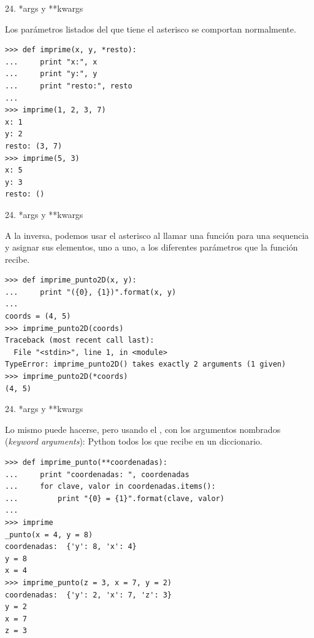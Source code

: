 \documentclass[14pt]{beamer}
\begin{document}
\begin{frame}[fragile]{24. *args y **kwargs}
  \begin{block}{}
    \centering
    Los parámetros listados  del que tiene el
    asterisco se comportan normalmente.
  \end{block}

  \begin{exampleblock}{}
    \scriptsize
    \begin{lstlisting}
>>> def imprime(x, y, *resto):
...     print "x:", x
...     print "y:", y
...     print "resto:", resto
...
>>> imprime(1, 2, 3, 7)
x: 1
y: 2
resto: (3, 7)
>>> imprime(5, 3)
x: 5
y: 3
resto: ()
    \end{lstlisting}
  \end{exampleblock}
\end{frame}

\begin{frame}[fragile]{24. *args y **kwargs}
  \begin{block}{}
    \small
    \centering
    A la inversa, podemos usar el asterisco al llamar una función para
     una sequencia y asignar sus elementos,
    uno a uno, a los diferentes parámetros que la función recibe.
  \end{block}

  \begin{exampleblock}{}
    \scriptsize
    \begin{lstlisting}
>>> def imprime_punto2D(x, y):
...     print "({0}, {1})".format(x, y)
...
coords = (4, 5)
>>> imprime_punto2D(coords)
Traceback (most recent call last):
  File "<stdin>", line 1, in <module>
TypeError: imprime_punto2D() takes exactly 2 arguments (1 given)
>>> imprime_punto2D(*coords)
(4, 5)
    \end{lstlisting}
  \end{exampleblock}
\end{frame}

\begin{frame}[fragile]{24. *args y **kwargs}
  \begin{alertblock}{}
    \small
    \centering
    Lo mismo puede hacerse, pero usando el , con los argumentos nombrados (\emph{keyword
      arguments}): Python  todos los que recibe en
    un diccionario.
  \end{alertblock}

  \begin{exampleblock}{}
    \scriptsize
    \begin{lstlisting}
>>> def imprime_punto(**coordenadas):
...     print "coordenadas: ", coordenadas
...     for clave, valor in coordenadas.items():
...         print "{0} = {1}".format(clave, valor)
...
>>> imprime
_punto(x = 4, y = 8)
coordenadas:  {'y': 8, 'x': 4}
y = 8
x = 4
>>> imprime_punto(z = 3, x = 7, y = 2)
coordenadas:  {'y': 2, 'x': 7, 'z': 3}
y = 2
x = 7
z = 3
    \end{lstlisting}
  \end{exampleblock}
\end{frame}
\end{document}
